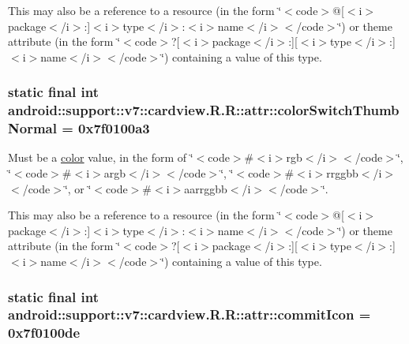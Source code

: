 This may also be a reference to a resource (in the form \char`\"{}$<$code$>$@\mbox{[}$<$i$>$package$<$/i$>$:\mbox{]}$<$i$>$type$<$/i$>$:$<$i$>$name$<$/i$>$$<$/code$>$\char`\"{}) or theme attribute (in the form \char`\"{}$<$code$>$?\mbox{[}$<$i$>$package$<$/i$>$:\mbox{]}\mbox{[}$<$i$>$type$<$/i$>$:\mbox{]}$<$i$>$name$<$/i$>$$<$/code$>$\char`\"{}) containing a value of this type. \hypertarget{classandroid_1_1support_1_1v7_1_1cardview_1_1_r_1_1attr_e86e068c2c05eb4d51173d9a5f10608c}{
\subsubsection[{colorSwitchThumbNormal}]{\setlength{\rightskip}{0pt plus 5cm}static final int android::support::v7::cardview.R.R::attr::colorSwitchThumbNormal = 0x7f0100a3}}
\label{classandroid_1_1support_1_1v7_1_1cardview_1_1_r_1_1attr_e86e068c2c05eb4d51173d9a5f10608c}


Must be a \hyperlink{classandroid_1_1support_1_1v7_1_1cardview_1_1_r_1_1color}{color} value, in the form of \char`\"{}$<$code$>$\#$<$i$>$rgb$<$/i$>$$<$/code$>$\char`\"{}, \char`\"{}$<$code$>$\#$<$i$>$argb$<$/i$>$$<$/code$>$\char`\"{}, \char`\"{}$<$code$>$\#$<$i$>$rrggbb$<$/i$>$$<$/code$>$\char`\"{}, or \char`\"{}$<$code$>$\#$<$i$>$aarrggbb$<$/i$>$$<$/code$>$\char`\"{}. 

This may also be a reference to a resource (in the form \char`\"{}$<$code$>$@\mbox{[}$<$i$>$package$<$/i$>$:\mbox{]}$<$i$>$type$<$/i$>$:$<$i$>$name$<$/i$>$$<$/code$>$\char`\"{}) or theme attribute (in the form \char`\"{}$<$code$>$?\mbox{[}$<$i$>$package$<$/i$>$:\mbox{]}\mbox{[}$<$i$>$type$<$/i$>$:\mbox{]}$<$i$>$name$<$/i$>$$<$/code$>$\char`\"{}) containing a value of this type. \hypertarget{classandroid_1_1support_1_1v7_1_1cardview_1_1_r_1_1attr_1b7c70e754d3be1551ba1f15848960a4}{
\subsubsection[{commitIcon}]{\setlength{\rightskip}{0pt plus 5cm}static final int android::support::v7::cardview.R.R::attr::commitIcon = 0x7f0100de}}
\label{classandroid_1_1support_1_1v7_1_1cardview_1_1_r_1_1attr_1b7c70e754d3be1551ba1f15848960a4}


